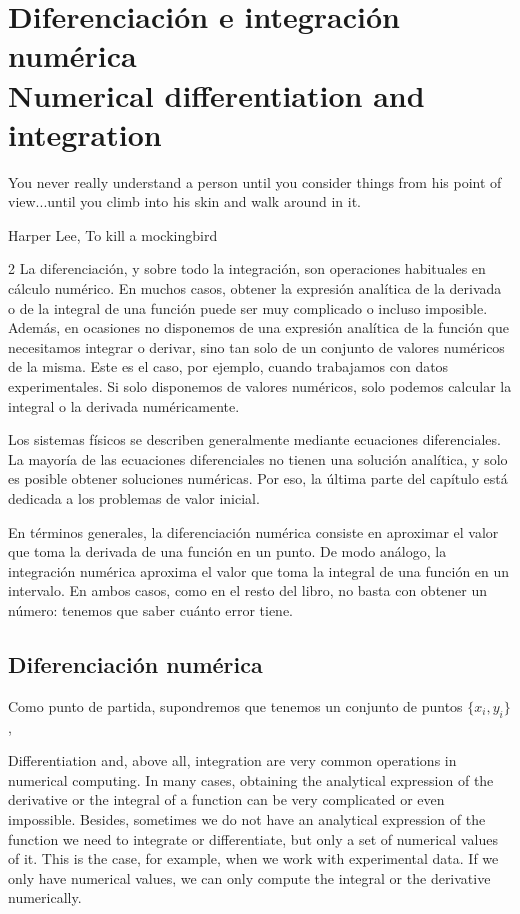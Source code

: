 \chapter{Diferenciación e integración numérica\\ Numerical differentiation and integration}\label{ch:integracion}
\epigraph{You never really understand a person until you consider things from his point of view...until you climb into his skin and walk around in it.}{Harper Lee, To kill a mockingbird}

\sloppy
\begin{paracol}{2}
La diferenciación, y sobre todo la integración, son operaciones habituales en cálculo nu\-mérico. En muchos casos, obtener la expresión analítica de la derivada o de la integral de una función puede ser muy complicado o incluso imposible. Además, en ocasiones no disponemos de una expresión analítica de la función que necesitamos integrar o derivar, sino tan solo de un conjunto de valores numéricos de la misma. Este es el caso, por ejemplo, cuando trabajamos con datos experimentales. Si solo disponemos de valores numéricos, solo podemos calcular la integral o la derivada numéricamente.

Los sistemas físicos se describen generalmente mediante ecuaciones diferenciales. La mayoría de las ecuaciones diferenciales no tienen una solución analítica, y solo es posible obtener soluciones numéricas. Por eso, la última parte del capítulo está dedicada a los problemas de valor inicial.

En términos generales, la diferenciación nu\-mérica consiste en aproximar el valor que toma la derivada de una función en un punto. De modo análogo, la integración numérica aproxima el valor que toma la integral de una función en un intervalo. En ambos casos, como en el resto del libro, no basta con obtener un número: tenemos que saber cuánto error tiene.

\section{Diferenciación numérica}
Como punto de partida, supondremos que tenemos un conjunto de puntos $\{x_i,y_i\}$,

\switchcolumn

Differentiation and, above all, integration are very common operations in numerical computing. In many cases, obtaining the analytical expression of the derivative or the integral of a function can be very complicated or even impossible. Besides, sometimes we do not have an analytical expression of the function we need to integrate or differentiate, but only a set of numerical values of it. This is the case, for example, when we work with experimental data. If we only have numerical values, we can only compute the integral or the derivative numerically.


\end{paracol}
